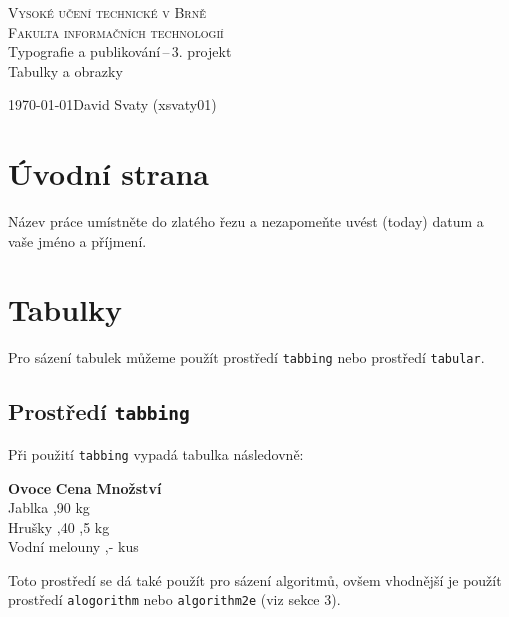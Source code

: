 \documentclass[a4paper,11pt, hidelinks]{article}
\begin{document}
    
\begin{titlepage}
    \begin{center}
        {\Huge \textsc{Vysoké učení technické v Brně}\\[0.5em]}
        {\huge \textsc{Fakulta informačních technologií}\\}
        {\LARGE Typografie a publikování\,--\,3. projekt}\\[0.4em]
        {\Huge Tabulky a obrazky \\}
    \end{center}

    {\Large \today \hfill David Svaty (xsvaty01)}
\end{titlepage}

\label{page:1}

\section{Úvodní strana}
\label{sec:1}
Název práce umístněte do zlatého řezu a nezapomeňte uvést  (today) datum a vaše jméno a příjmení.

\section{Tabulky}
\label{sec:2}
Pro sázení tabulek můžeme použít prostředí \texttt{tabbing} nebo prostředí \texttt{tabular}.

\subsection{Prostředí \texttt{tabbing}}
Při použití \texttt{tabbing} vypadá tabulka následovně:
\begin{tabbing}
    \textbf{Ovoce} \hspace{16mm} \= \textbf{Cena} \hspace{4mm} \= \textbf{Množství} \\
    Jablka ,90  kg \\
    Hrušky ,40 ,5 kg \\
    Vodní melouny ,-  kus \\
\end{tabbing}
\label{tab:1}
Toto prostředí se dá také použít pro sázení algoritmů, ovšem vhodnější je použít prostředí \texttt{alogorithm} nebo \texttt{algorithm2e} (viz sekce 3).
\end{document}
